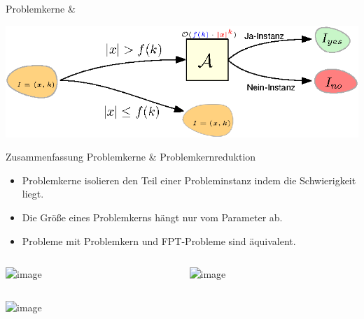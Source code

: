 \documentclass[navbaroff]{sdqbeamer}
\begin{document}
\begin{frame}[t]{Problemkerne \& \FPT}
\begin{overlayarea}{1\textwidth}{1\textheight}
{            \includegraphics{images/reduction-proof.eps}
        }
    \end{overlayarea}
\end{frame}

\begin{frame}{Zusammenfassung Problemkerne \& Problemkernreduktion}
    \begin{itemize}
        \item Problemkerne isolieren den Teil einer Probleminstanz indem die Schwierigkeit liegt.
        \item Die Größe eines Problemkerns hängt nur vom Parameter ab.
        \item Probleme mit Problemkern und FPT-Probleme sind äquivalent.
    \end{itemize}

\end{frame}

\begin{frame}
    \centering
    \centering
    \begin{overlayarea}{1\textwidth}{1\textheight}
        \centering
        \begin{columns}
            \centering
            \begin{column}{0.5\textwidth}
                \centering
                \includegraphics<1->[width=160pt]{images/cartoon1.png}
            \end{column}
            \centering
            \begin{column}{0.5\textwidth}
                \centering
                \includegraphics<2->[width=200pt]{images/cartoon2.png}
            \end{column}                
        \end{columns}
        \vspace{10pt}
        \includegraphics<3->[width=220pt]{images/cartoon3.png}
    \end{overlayarea}    
\end{frame}
\end{document}

